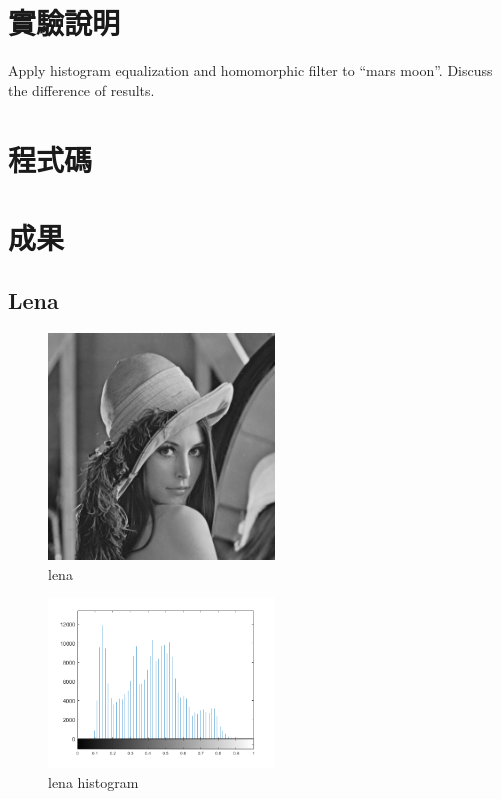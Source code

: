 \documentclass[conference]{IEEEtran}
\begin{document}


\section{實驗說明}
Apply histogram equalization and homomorphic filter to “mars moon”.
Discuss the difference of results.

\section{程式碼}


\section{成果}
\subsection{Lena}

\begin{figure}[H]
\centerline{\includegraphics[width=6cm]{lena.png}}
\caption{lena}
\label{lena}
\end{figure}


\begin{figure}[H]
\centerline{\includegraphics[width=6cm]{lena_hist.png}}
\caption{lena histogram}
\label{lena_hist}
\end{figure}
\end{document}
